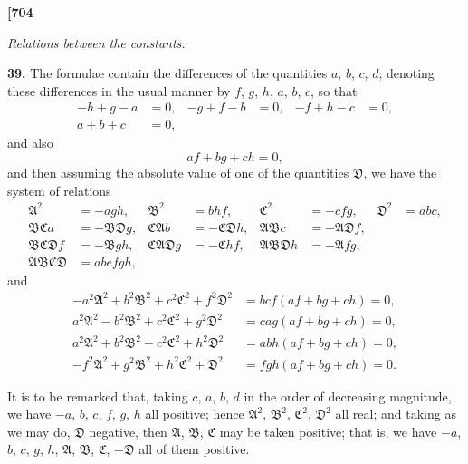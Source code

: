 \documentclass[11pt,a4paper]{book}
\begin{document}
\vspace{0.5em}

\noindent\textbf{[704}

\vspace{0.5em}

\begin{center}
\textit{Relations between the constants.}
\end{center}

\vspace{0.5em}

\noindent\textbf{39.}\quad
The formulae contain the differences of the quantities $a$, $b$, $c$, $d$; denoting these differences in the usual manner by $f$, $g$, $h$, $a$, $b$, $c$, so that
\begin{align*}
-h + g - a &= 0, & -g + f - b &= 0, & -f + h - c &= 0, \\
a + b + c &= 0,
\end{align*}
and also
\[
af + bg + ch = 0,
\]
and then assuming the absolute value of one of the quantities $\mathfrak{D}$, we have the system of relations
\begin{align*}
\mathfrak{A}^2 &= -agh, & \mathfrak{B}^2 &= bhf, & \mathfrak{C}^2 &= -cfg, & \mathfrak{D}^2 &= abc, \\
\mathfrak{B}\mathfrak{C}a &= -\mathfrak{B}\mathfrak{D}g, & \mathfrak{C}\mathfrak{A}b &= -\mathfrak{C}\mathfrak{D}h, & \mathfrak{A}\mathfrak{B}c &= -\mathfrak{A}\mathfrak{D}f, \\
\mathfrak{B}\mathfrak{C}\mathfrak{D}f &= -\mathfrak{B}gh, & \mathfrak{C}\mathfrak{A}\mathfrak{D}g &= -\mathfrak{C}hf, & \mathfrak{A}\mathfrak{B}\mathfrak{D}h &= -\mathfrak{A}fg, \\
\mathfrak{A}\mathfrak{B}\mathfrak{C}\mathfrak{D} &= abefgh,
\end{align*}
and
\begin{align*}
-a^2\mathfrak{A}^2 + b^2\mathfrak{B}^2 + c^2\mathfrak{C}^2 + f^2\mathfrak{D}^2 &= bcf(af + bg + ch) = 0, \\
a^2\mathfrak{A}^2 - b^2\mathfrak{B}^2 + c^2\mathfrak{C}^2 + g^2\mathfrak{D}^2 &= cag(af + bg + ch) = 0, \\
a^2\mathfrak{A}^2 + b^2\mathfrak{B}^2 - c^2\mathfrak{C}^2 + h^2\mathfrak{D}^2 &= abh(af + bg + ch) = 0, \\
-f^2\mathfrak{A}^2 + g^2\mathfrak{B}^2 + h^2\mathfrak{C}^2 + \mathfrak{D}^2 &= fgh(af + bg + ch) = 0.
\end{align*}

It is to be remarked that, taking $c$, $a$, $b$, $d$ in the order of decreasing magnitude, we have $-a$, $b$, $c$, $f$, $g$, $h$ all positive; hence $\mathfrak{A}^2$, $\mathfrak{B}^2$, $\mathfrak{C}^2$, $\mathfrak{D}^2$ all real; and taking as we may do, $\mathfrak{D}$ negative, then $\mathfrak{A}$, $\mathfrak{B}$, $\mathfrak{C}$ may be taken positive; that is, we have $-a$, $b$, $c$, $g$, $h$, $\mathfrak{A}$, $\mathfrak{B}$, $\mathfrak{C}$, $-\mathfrak{D}$ all of them positive.
\end{document}
